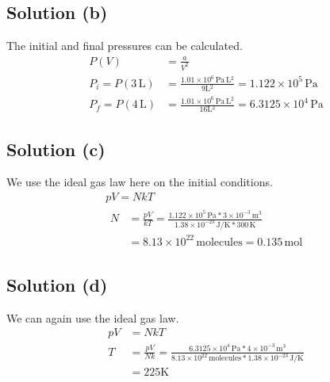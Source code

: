 \documentclass[12pt]{article}
\newcommand{\E}[1]{\times 10^{#1}}
\begin{document}
        \subsection{Solution (b)}
            The initial and final pressures can be calculated.
            \begin{align}
                P(V)    &=  \frac{a}{V^2}\\
                P_i =   P(3\,\unit{\liter}) &=  \frac{1.01\E{6}\,\unit{\pascal\,\liter^2}}{9\unit{\liter^2}}
                    =   1.122\E{5}\,\unit{\pascal}\\
                P_f =   P(4\,\unit{\liter}) &=  \frac{1.01\E{6}\,\unit{\pascal\,\liter^2}}{16\unit{\liter^2}}
                    =   6.3125\E{4}\,\unit{\pascal}
            \end{align}

        \subsection{Solution (c)}
            We use the ideal gas law here on the initial conditions.
            \begin{gather}
                pV  =   NkT\\
                \begin{align}
                    N   &=  \frac{pV}{kT}
                        =   \frac{1.122\E{5}\,\unit{\pascal} * 3\E{-3}\,\unit{\meter^3}}{1.38\E{-23}\,\unit{\joule/\kelvin} * 300\,\unit{\kelvin}}\\
                        &=  8.13\E{22}\,\text{molecules}
                        =   \boxed{0.135\,\unit{\mole}}
                \end{align}
            \end{gather}

        \subsection{Solution (d)}
            We can again use the ideal gas law.
            \begin{align}
                pV  &=  NkT\\
                T   &=  \frac{pV}{Nk}
                    =   \frac{6.3125\E{4}\,\unit{\pascal} * 4\E{-3}\,\unit{\meter^3}}{8.13\E{22}\,\text{molecules} * 1.38\E{-23}\,\unit{\joule/\kelvin}}\\
                    &=  \boxed{225\unit{\kelvin}}
            \end{align}
\end{document}
